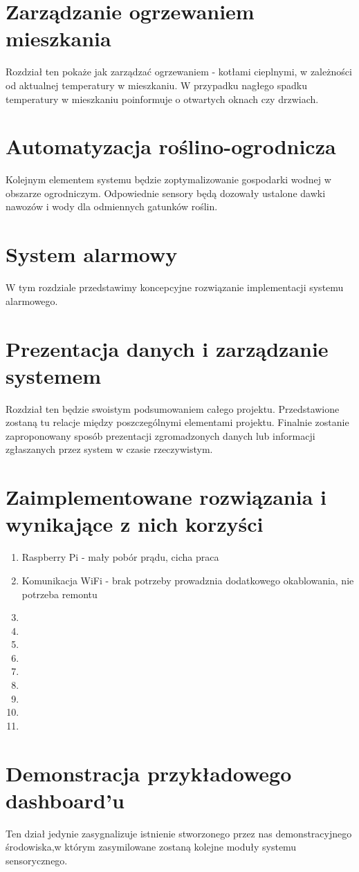 \documentclass[12pt]{article} %
\begin{document}
\section{Zarządzanie ogrzewaniem mieszkania}
Rozdział ten pokaże jak zarządzać ogrzewaniem - kotłami cieplnymi, w zależności od aktualnej temperatury w mieszkaniu. W przypadku nagłego spadku temperatury w mieszkaniu poinformuje o otwartych oknach czy drzwiach.

\section{Automatyzacja roślino-ogrodnicza}
Kolejnym elementem systemu będzie zoptymalizowanie gospodarki wodnej w obszarze ogrodniczym. Odpowiednie sensory będą dozowały ustalone dawki nawozów i wody dla odmiennych gatunków roślin.

\section{System alarmowy}
W tym rozdziale przedstawimy koncepcyjne rozwiązanie implementacji systemu alarmowego.

\section{Prezentacja danych i zarządzanie systemem}
Rozdział ten będzie swoistym podsumowaniem całego projektu. Przedstawione zostaną tu relacje między poszczególnymi elementami projektu. Finalnie zostanie zaproponowany sposób prezentacji zgromadzonych danych lub informacji zgłaszanych przez system w czasie rzeczywistym.

\section{Zaimplementowane rozwiązania i wynikające z nich korzyści}
\begin{enumerate}
\item Raspberry Pi - mały pobór prądu, cicha praca
\item Komunikacja WiFi - brak potrzeby prowadznia dodatkowego okablowania, nie potrzeba remontu
\item 
\item 
\item 
\item 
\item 
\item 
\item 
\item 
\item 
\end{enumerate}

\section{Demonstracja przykładowego dashboard'u}
Ten dział jedynie zasygnalizuje istnienie stworzonego przez nas demonstracyjnego środowiska,w którym zasymilowane zostaną kolejne moduły systemu sensorycznego.
\end{document}
